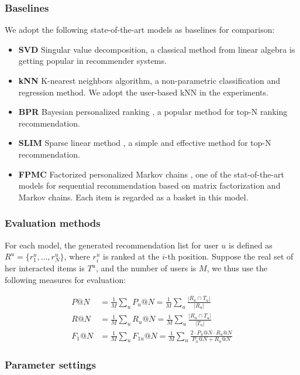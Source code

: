 \documentclass[runningheads]{llncs}
\begin{document}
\subsubsection{Baselines}
We adopt the following state-of-the-art models as baselines for comparison:
\begin{itemize}
    \item \textbf{SVD} Singular value decomposition, a classical method from linear algebra is getting popular in recommender systems.
    \item \textbf{kNN} K-nearest neighbors algorithm, a non-parametric classification and regression method. We adopt the user-based kNN in the experiments.
    \item \textbf{BPR} Bayesian personalized ranking \cite{rendle2012bpr}, a popular method for top-N ranking recommendation. 
    \item \textbf{SLIM} Sparse linear method \cite{ning2011slim}, a simple and effective method for top-N recommendation.
    \item \textbf{FPMC} Factorized personalized Markov chains \cite{rendle2010factorizing}, one of the stat-of-the-art models for sequential recommendation based on matrix factorization and Markov chains. Each item is regarded as a basket in this model.
\end{itemize}

\subsubsection{Evaluation methods} For each model, the generated recommendation list for user $u$ is defined as $R^u = \{r_1^u,\ldots,r_N^u \}$, where $r_i^u$ is ranked at the $i$-th position. Suppose the real set of her interacted items is $T^u$, and the number of users is $M$, we thus use the following measures for evaluation:

\begin{align*}
P@N &= \frac{1}{M}\sum_u P_u@N = \frac{1}{M} \sum_u \frac{|R_u \cap T_u|}{|R_u|}\\
R@N &= \frac{1}{M}\sum_u R_u@N = \frac{1}{M} \sum_u \frac{|R_u \cap T_u|}{|T_u|}\\
F_1@N &= \frac{1}{M}\sum_u F_{1u}@N = \frac{1}{M} \sum_u \frac{2 \cdot P_u@N \cdot R_u@N}{P_u@N + R_u@N}
\end{align*}    




\subsubsection{Parameter settings}
\end{document}
